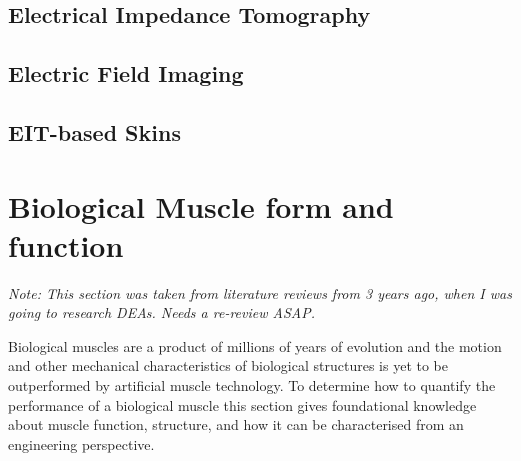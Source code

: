  \subsection{Electrical Impedance Tomography}

 \subsection{Electric Field Imaging}

 \subsection{EIT-based Skins}



\section{Biological Muscle form and function}
\textit{Note: This section was taken from literature reviews from 3 years ago, when I was going to research DEAs. Needs a re-review ASAP.}

Biological muscles are a product of millions of years of evolution and the motion and other mechanical characteristics of biological structures is yet to be outperformed by artificial muscle technology. To determine how to quantify the performance of a biological muscle this section gives foundational knowledge about muscle function, structure, and how it can be characterised from an engineering perspective. 


